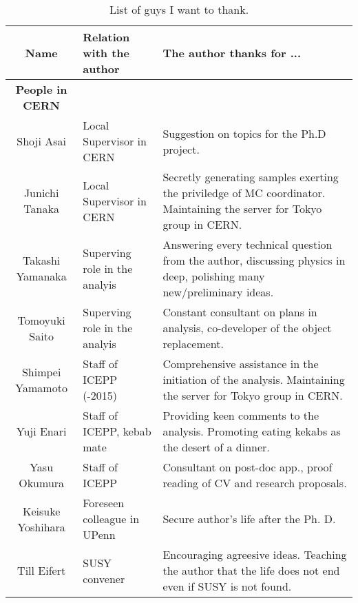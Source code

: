 \clearpage

\begin{table}[h]    
  \small
  \centering
  \caption{List of guys I want to thank.}
  \label{tab::Acknowledgement2}
  \begin{tabularx}{\linewidth}{clX}
    \toprule
    Name               & Relation with the author        & The author thanks for ... \\
    \midrule
    \midrule
    \textbf{People in CERN}     &               & \\
    \midrule
    Shoji Asai         &   Local Supervisor in CERN                                                       &  Suggestion on topics for the Ph.D project.   \\
    Junichi Tanaka     &   Local Supervisor in CERN                                                       &  Secretly generating samples exerting the priviledge of MC coordinator. Maintaining the server for Tokyo group in CERN.   \\
    Takashi Yamanaka   &   Superving role in the analyis                                                      &  Answering every technical question from the author, discussing physics in deep, polishing many new/preliminary ideas.  \\
    Tomoyuki Saito     &   Superving role in the analyis                                                      &  Constant consultant on plans in analysis, co-developer of the object replacement.   \\   
    Shimpei Yamamoto   &   Staff of ICEPP (-2015)                                                         &  Comprehensive assistance in the initiation of the analysis. Maintaining the server for Tokyo group in CERN.  \\   
    Yuji Enari         &   Staff of ICEPP, kebab mate                                                     &  Providing keen comments to the analysis. Promoting eating kekabs as the desert of a dinner.   \\   
    Yasu Okumura       &   Staff of ICEPP                                                                 &  Consultant on post-doc app., proof reading of CV and research proposals.   \\   
    Keisuke Yoshihara  &   Foreseen colleague in UPenn                                                    &  Secure author's life after the Ph. D.   \\   
    Till Eifert        &   SUSY convener                             &  Encouraging agreesive ideas. Teaching the author that the life does not end even if SUSY is not found.  \\   

\end{tabularx}
\end{table}

